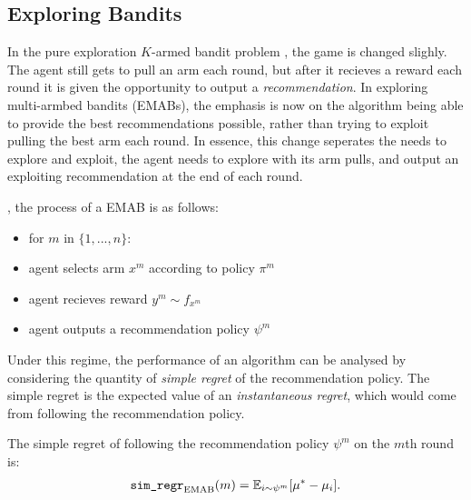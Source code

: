 





    \subsection{Exploring Bandits}
    \label{sec:2-3-1-exploring-mab}

        In the pure exploration $K$-armed bandit problem ,
        the game is changed slighly. The agent still gets to pull an arm each round, but after it recieves a reward each round it is given the opportunity to output a \textit{recommendation}. In exploring multi-armbed bandits (EMABs), the emphasis is now on the algorithm being able to provide the best recommendations possible, rather than trying to exploit pulling the best arm each round. In essence, this change seperates the needs to explore and exploit, the agent needs to explore with its arm pulls, and output an exploiting recommendation at the end of each round.

        , the process of a EMAB is as follows:
        \begin{itemize}
            \item for $m$ in $\{1,...,n\}$:
            \item agent selects arm $x^m$ according to policy $\pi^m$
            \item agent recieves reward $y^m \sim f_{x^m}$
            \item agent outputs a recommendation policy $\psi^m$
        \end{itemize}

        Under this regime, the performance of an algorithm can be analysed by considering the quantity of \textit{simple regret} of the recommendation policy. The simple regret is the expected value of an \textit{instantaneous regret},  which would come from following the recommendation policy.

        \begin{defn}
            The \textnormal{simple regret} of following the recommendation policy $\psi^m$ on the $m$th round is:
            \begin{align}
                {\textnormal{\texttt{sim\_regr}}}_{{\textnormal{EMAB}}}(m) = \mathbb{E}_{i\sim\psi^m}[\mu^* - \mu_i].
            \end{align}
        \end{defn}

